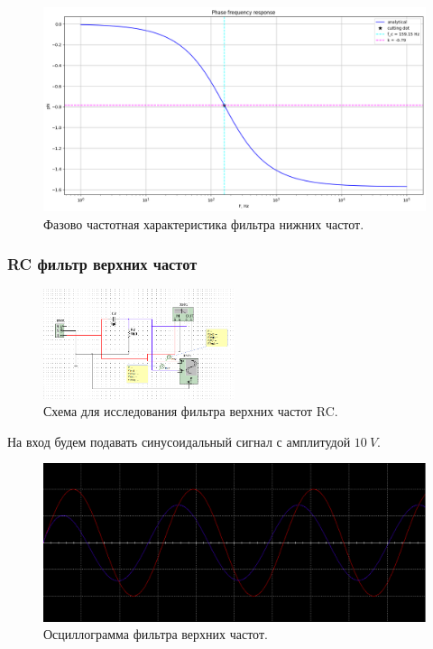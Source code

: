 \documentclass[12pt]{article}
\begin{document}
\begin{figure}[H]
    \centering
    \includegraphics[width=\textwidth]{1_pfr.png}
    \caption{Фазово частотная характеристика фильтра нижних частот.}
    \label{fig:1_pfr}
\end{figure}

\subsubsection*{RC фильтр верхних частот}
\begin{figure}[H]
    \centering
    \includegraphics[width=0.5\textwidth]{2_scheme.png}
    \caption{Схема для исследования фильтра верхних частот RC.}
    \label{fig:2_scheme}
\end{figure}

На вход будем подавать синусоидальный сигнал с амплитудой $10 \ V$. \\

\begin{figure}[H]
    \centering
    \includegraphics[width=\textwidth]{2_osc.png}
    \caption{Осциллограмма фильтра верхних частот.}
    \label{fig:2_osc}
\end{figure}
\end{document}

